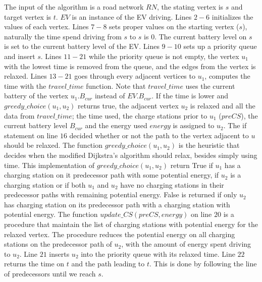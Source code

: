 The input of the algorithm is a road network $RN$, the stating vertex is $s$ and target vertex is $t$. $EV$ is an instance of the EV driving. Lines $2-6$ initializes the values of each vertex. Lines $7-8$ sets proper values on the starting vertex ($s$), naturally the time spend driving from $s$ to $s$ is $0$. The current battery level on $s$ is set to the current battery level of the EV. Lines $9-10$ sets up a priority queue and insert $s$. Lines $11-21$ while the priority queue is not empty, the vertex $u_1$ with the lowest time is removed from the queue, and the edges from the vertex is relaxed. Lines $13-21$ goes through every adjacent vertices to $u_1$, computes the time with the $travel\_time$ function. Note that $travel\_time$ uses the current battery of the vertex $u_1.B_{cur}$ instead of $EV.B_{cur}$. If the time is lower and $greedy\_choice(u_1, u_2)$ returns true, the adjacent vertex $u_2$ is relaxed and all the data from $travel\_time$; the time used, the charge stations prior to $u_1$ ($preCS$), the current battery level $B_{cur}$ and the energy used $energy$ is assigned to $u_2$. The if statement on line $16$ decided whether or not the path to the vertex adjacent to $u$ should be relaxed. The function $greedy\_choice(u_1,u_2)$ is the heuristic that decides when the modified Dijkstra's algorithm should relax, besides simply using time. This implementation of $greedy\_choice(u_1,u_2)$ return True if $u_1$ has a charging station on it predecessor path with some potential energy, if $u_2$ is a charging station or if both $u_1$ and $u_2$ have no charging stations in their predecessor paths with remaining potential energy. False is returned if only $u_2$ has charging station on its predecessor path with a charging station with potential energy.
The function $update\_CS(preCS, energy)$ on line $20$ is a procedure that maintain the list of charging stations with potential energy for the relaxed vertex. The procedure reduces the potential energy on all charging stations on the predecessor path of $u_2$, with the amount of energy spent driving to $u_2$. Line $21$ inserts $u_2$ into the priority queue with its relaxed time. Line $22$ returns the time on $t$ and the path leading to $t$. This is done by following the line of predecessors until we reach $s$.

